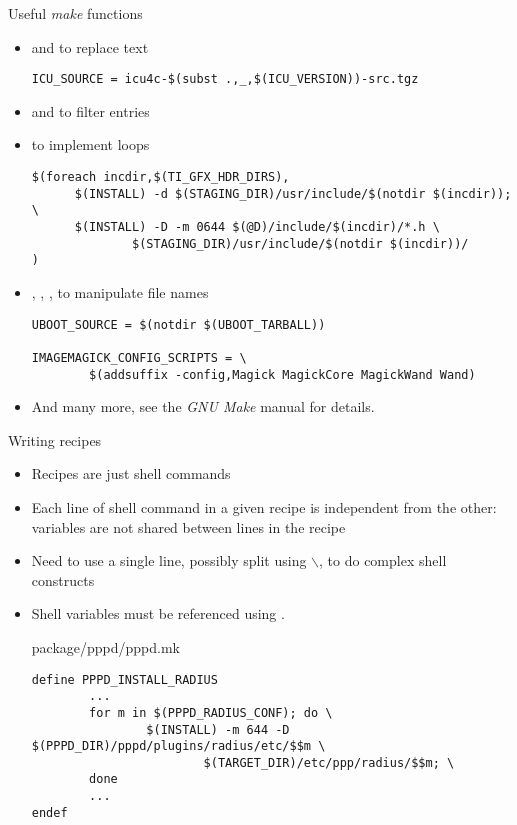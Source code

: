 \begin{frame}[fragile]{Useful {\em make} functions}
  \begin{itemize}
  \item {} and  to replace text
    \begin{block}{}
\begin{verbatim}
ICU_SOURCE = icu4c-$(subst .,_,$(ICU_VERSION))-src.tgz
\end{verbatim}
    \end{block}
  \item {} and  to filter entries
  \item {} to implement loops
\begin{block}{}
\begin{verbatim}
$(foreach incdir,$(TI_GFX_HDR_DIRS),
      $(INSTALL) -d $(STAGING_DIR)/usr/include/$(notdir $(incdir)); \
      $(INSTALL) -D -m 0644 $(@D)/include/$(incdir)/*.h \
              $(STAGING_DIR)/usr/include/$(notdir $(incdir))/
)
\end{verbatim}
\end{block}
  \item {}, , , 
    to manipulate file names
    \begin{block}{}
\begin{verbatim}
UBOOT_SOURCE = $(notdir $(UBOOT_TARBALL))

IMAGEMAGICK_CONFIG_SCRIPTS = \
        $(addsuffix -config,Magick MagickCore MagickWand Wand)
\end{verbatim}
    \end{block}
  \item And many more, see the {\em GNU Make} manual for details.
  \end{itemize}
\end{frame}

\begin{frame}[fragile]{Writing recipes}

  \begin{itemize}
  \item Recipes are just shell commands
  \item Each line of shell command in a given recipe is independent
    from the other: variables are not shared between lines in the
    recipe
  \item Need to use a single line, possibly split using $\backslash$,
    to do complex shell constructs
  \item Shell variables must be referenced using .
    \begin{block}{package/pppd/pppd.mk}
\begin{verbatim}
define PPPD_INSTALL_RADIUS
        ...
        for m in $(PPPD_RADIUS_CONF); do \
                $(INSTALL) -m 644 -D $(PPPD_DIR)/pppd/plugins/radius/etc/$$m \
                        $(TARGET_DIR)/etc/ppp/radius/$$m; \
        done
        ...
endef
\end{verbatim}
\end{block}
  \end{itemize}
\end{frame}
